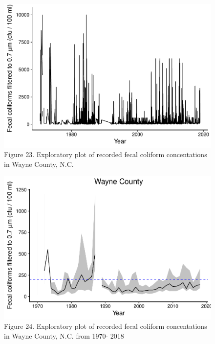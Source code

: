 \documentclass[12pt,]{article}
\begin{document}
\begin{figure}
\centering
\includegraphics{Edmondson_ENV872_Project_files/figure-latex/unnamed-chunk-22-1.pdf}
\caption{Figure 23. Exploratory plot of recorded fecal coliform
concentations in Wayne County, N.C.}
\end{figure}

\begin{figure}
\centering
\includegraphics{Edmondson_ENV872_Project_files/figure-latex/unnamed-chunk-23-1.pdf}
\caption{Figure 24. Exploratory plot of recorded fecal coliform
concentations in Wayne County, N.C. from 1970- 2018}
\end{figure}
\end{document}
